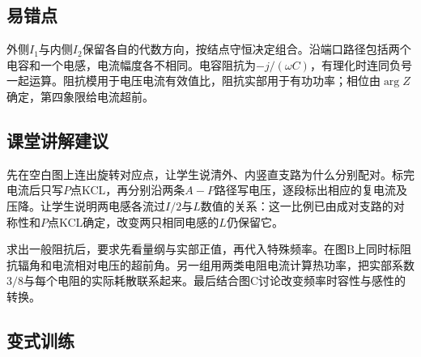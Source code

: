 \documentclass[UTF8,fontset=fandol,a4paper,11pt]{ctexart}
\begin{document}

\subsection*{易错点}

外侧$I_1$与内侧$I_2$保留各自的代数方向，按结点守恒决定组合。沿端口路径包括两个电容和一个电感，电流幅度各不相同。电容阻抗为$-j/(\omega C)$，有理化时连同负号一起运算。阻抗模用于电压电流有效值比，阻抗实部用于有功功率；相位由$\arg Z$确定，第四象限给电流超前。



\subsection*{课堂讲解建议}

先在空白图上连出旋转对应点，让学生说清外、内竖直支路为什么分别配对。标完电流后只写$P$点KCL，再分别沿两条$A-P$路径写电压，逐段标出相应的复电流及压降。让学生说明两电感各流过$I/2$与$L$数值的关系：这一比例已由成对支路的对称性和$P$点KCL确定，改变两只相同电感的$L$仍保留它。

求出一般阻抗后，要求先看量纲与实部正值，再代入特殊频率。在图B上同时标阻抗辐角和电流相对电压的超前角。另一组用两类电阻电流计算热功率，把实部系数$3/8$与每个电阻的实际耗散联系起来。最后结合图C讨论改变频率时容性与感性的转换。



\subsection*{变式训练}
\end{document}

